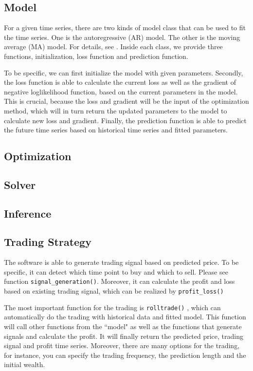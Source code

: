 \documentclass[12pt,a4paper]{article}
\begin{document}
 


\subsection{Model}
For a given time series, there are two kinds of model class that can be used to fit the time series. One is the autoregressive  (AR) model. The other is the moving average (MA) model. For details, see \cite{Fan}. Inside each class, we provide three functions, initialization, loss function and prediction function. 

To be specific, we can first initialize the model with given parameters. Secondly, the loss function is able to calculate the current loss as well as the gradient of negative loglikelihood function, based on the current parameters in the model. This is crucial, because the loss and gradient will be the input of the optimization method, which will in turn return the updated parameters to the model to calculate new loss and gradient. Finally, the prediction function is able to predict the future time series based on historical time series and fitted parameters.
\subsection{Optimization}



\subsection{Solver}


\subsection{Inference}


\subsection{Trading Strategy}

The software is able to generate trading signal based on predicted price. To be specific, it can detect which time point to buy and which to sell. Please see function \texttt{signal\_generation()}. Moreover, it can calculate the profit and loss based on existing trading signal, which can be realized by \texttt{profit\_loss()}

The most important function for the trading is \texttt{rolltrade()} , which can automatically do the trading with historical data and fitted model. This function will call other  functions from the ``model" as well as the functions that generate signals and calculate the profit. It will finally return the predicted price, trading signal and profit time series. Moreover, there are many options for the trading, for instance, you can specify the trading frequency, the prediction length and the initial wealth. 
\end{document}
